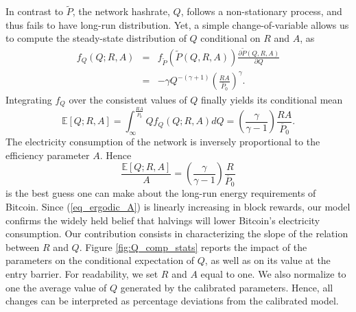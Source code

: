 \documentclass[12pt, a4paper]{article}
\begin{document}
In contrast to $\tilde{P}$, the network hashrate, $Q$, follows a non-stationary process, and thus fails to have long-run distribution.
Yet, a simple change-of-variable allows us to compute the steady-state distribution of $Q$ conditional on $R$ and $A$, as
\begin{eqnarray*}\label{eq_ergodic_Q}
f_Q(Q;R,A)&=&f_{\tilde{P}}\left(\tilde{P}(Q,R,A)\right)\frac{\partial \tilde{P}(Q,R,A)}{\partial Q}\\
& =&-\gamma Q ^{-(\gamma+1)}\left(\frac{RA}{\overline{P}_0}\right)^{\gamma}.
\end{eqnarray*}
Integrating $f_Q$ over the consistent values of $Q$ finally yields its conditional mean
\begin{equation}\label{eq_ergodic}
\mathbb{E}[Q;R,A]= \int_{\infty}^{\frac{RA}{\overline{P}_0}} Qf_Q(Q;R,A)dQ = \left(\frac{\gamma}{\gamma-1}\right)\frac{RA}{\overline{P}_0}.
\end{equation}
The electricity consumption of the network is inversely proportional to the efficiency parameter $A$. Hence
\begin{equation}\label{eq_ergodic_A}
\frac{\mathbb{E}[Q;R,A]}{A}= \left(\frac{\gamma}{\gamma-1}\right)\frac{R}{\overline{P}_0}
\end{equation}
is the best guess one can make about the long-run energy requirements of Bitcoin. Since (\ref{eq_ergodic_A}) is linearly increasing
in block rewards, our model confirms the widely held belief that halvings will lower Bitcoin's electricity consumption.
Our contribution consists in characterizing the slope of the relation between $R$ and
$Q$. Figure \ref{fig:Q_comp_stats} reports the impact of the parameters on
the conditional expectation of $Q$, as well as on its value at the entry barrier.
For readability, we set $R$ and $A$ equal to one. We also normalize to one the average value
of $Q$ generated by the calibrated parameters.
Hence, all changes can be interpreted as percentage deviations from the calibrated model.
\end{document}
